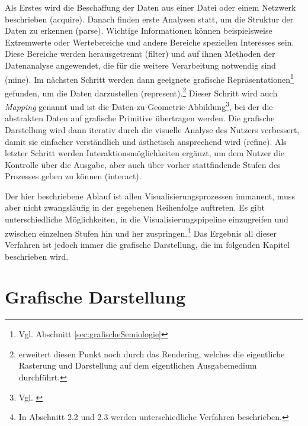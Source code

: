 \documentclass[a4paper, 12pt, DIVcalc, onepage, pdftex, headsepline, footsepline]{scrreprt}
\begin{document}
Als Erstes wird die Beschaffung der Daten aus einer Datei oder einem Netzwerk
beschrieben (acquire). Danach finden erste Analysen statt, um die Struktur der Daten zu erkennen (parse).
Wichtige Informationen können beispielsweise Extremwerte oder Wertebereiche und andere Bereiche speziellen
Interesses sein.
Diese Bereiche werden herausgetrennt (filter) und auf ihnen Methoden der Datenanalyse angewendet,
die für die weitere Verarbeitung notwendig sind (mine). Im nächsten Schritt werden dann geeignete
grafische Repräsentationen\footnote{Vgl. Abschnitt \ref{sec:grafischeSemiologie}} gefunden, um die Daten
darzustellen (represent).\footnote{\citep{Schumann} erweitert diesen Punkt noch durch das Rendering, welches die eigentliche Rasterung
und Darstellung auf dem eigentlichen Ausgabemedium durchführt.}
Dieser Schritt wird auch \textit{Mapping} genannt und ist die Daten-zu-Geometrie-Abbildung\footnote{Vgl. \citep[S.\,16]{Schumann}}, bei der
die abstrakten Daten auf grafische Primitive übertragen werden.
Die grafische Darstellung wird dann iterativ durch die visuelle Analyse des Nutzers
verbessert, damit sie einfacher verständlich und ästhetisch ansprechend wird (refine). Als letzter
Schritt werden Interaktionsmöglichkeiten ergänzt, um dem Nutzer die Kontrolle über die
Ausgabe, aber auch über vorher stattfindende Stufen des Prozesses geben zu können (interact).

Der hier beschriebene Ablauf ist allen Visualisierungsprozessen immanent, muss aber nicht zwangsläufig
in der gegebenen Reihenfolge auftreten. Es gibt unterschiedliche Möglichkeiten, in die
Visualisierungspipeline einzugreifen und zwischen einzelnen Stufen hin und her
zuspringen.\footnote{In \citep{Schumann} Abschnitt 2.2 und 2.3 werden
unterschiedliche Verfahren beschrieben.}
Das Ergebnis all dieser Verfahren ist jedoch immer die grafische Darstellung, die im
folgenden Kapitel beschrieben wird.

\section{Grafische Darstellung}
\label{sec:Darstellungen}
\end{document}
